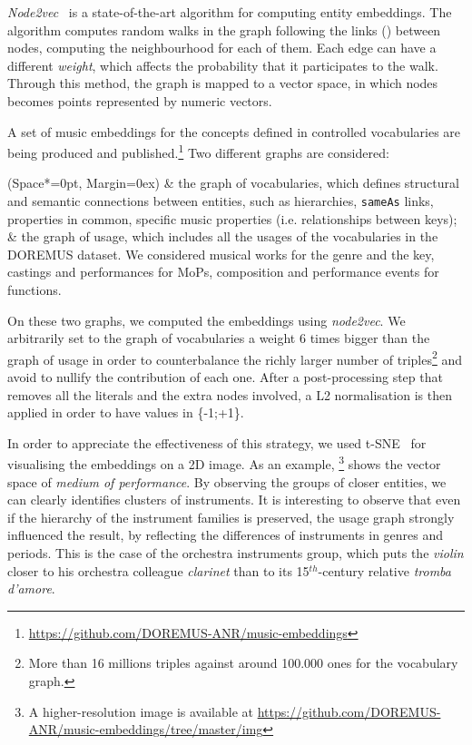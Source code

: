 \documentclass{article}
\begin{document}
\textit{Node2vec}~\cite{node2vec-kdd2016} is a state-of-the-art algorithm for computing entity embeddings. The algorithm computes random walks in the graph following the links () between nodes, computing the neighbourhood for each of them. Each edge can have a different \textit{weight}, which affects the probability that it participates to the walk. Through this method, the graph is mapped to a vector space, in which nodes becomes points represented by numeric vectors.

A set of music embeddings for the concepts defined in controlled vocabularies are being produced and published.\footnote{
\url{https://github.com/DOREMUS-ANR/music-embeddings}} 
Two different graphs are considered:
\begin{easylist}[itemize]
\ListProperties(Space*=0pt, Margin=0ex)
& the graph of vocabularies, which defines structural and semantic connections between entities, such as hierarchies, \texttt{sameAs} links, properties in common, specific music properties (i.e. relationships between keys);
& the graph of usage, which includes all the usages of the vocabularies in the DOREMUS dataset. We considered musical works for the genre and the key, castings and performances for MoPs, composition and performance events for functions.
\end{easylist}

On these two graphs, we computed the embeddings using \textit{node2vec}. We arbitrarily set to the graph of vocabularies a weight 6 times bigger than the graph of usage in order to counterbalance the richly larger number of triples\footnote{More than 16 millions triples against around 100.000 ones for the vocabulary graph.} and avoid to nullify the contribution of each one. After a post-processing step that removes all the literals and the extra nodes involved, a L2 normalisation is then applied in order to have values in \{-1;+1\}.

In order to appreciate the effectiveness of this strategy, we used t-SNE~\cite{maaten2008visualizing} for visualising the embeddings on a 2D image. As an example, \footnote{A higher-resolution image is available at 
\url{https://github.com/DOREMUS-ANR/music-embeddings/tree/master/img}} shows the vector space of \textit{medium of performance}. By observing the groups of closer entities, we can clearly identifies clusters of instruments. It is interesting to observe that even if the hierarchy of the instrument families is preserved, the usage graph strongly influenced the result, by reflecting the differences of instruments in genres and periods. This is the case of the orchestra instruments group, which puts the \textit{violin} closer to his orchestra colleague \textit{clarinet} than to its 15$^{th}$-century relative \textit{tromba d'amore}.
\end{document}
